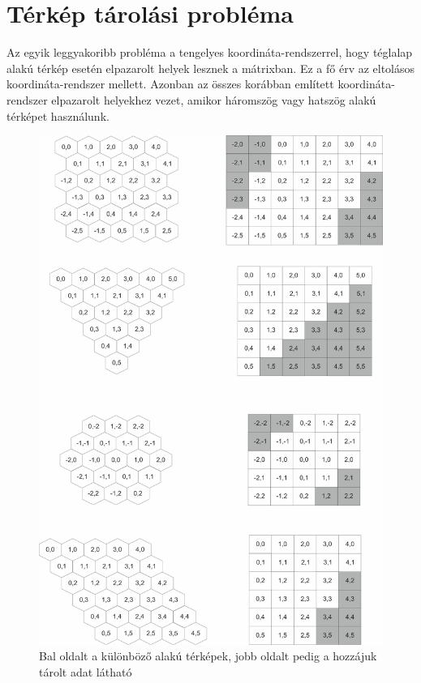 \newpage 

\section{Térkép tárolási probléma}

Az egyik leggyakoribb probléma a tengelyes koordináta-rendszerrel, hogy téglalap alakú térkép esetén elpazarolt helyek lesznek a mátrixban. Ez a fő érv az eltolásos koordináta-rendszer mellett. Azonban az összes korábban említett koordináta-rendszer elpazarolt helyekhez vezet, amikor háromszög vagy hatszög alakú térképet használunk.
\newline

\begin{figure}[h!]
\centering
\includegraphics[scale=0.2]{kepek/StorageProblem.jpg}
\caption{Bal oldalt a különböző alakú térképek, jobb oldalt pedig a hozzájuk tárolt adat látható}
\label{fig:StorageProblem}
\end{figure}

